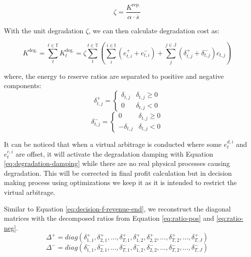 \begin{equation*}
\zeta = \frac{K^{\text{rep.}}}{\alpha \cdot \overline{s}}
\end{equation*}

With the unit degradation $\zeta$, we can then calculate degradation cost as:

\begin{equation}
\label{eq:degradation-damping}
K^{\text{deg.}} = \sum_{t}^{t \in \mathbb{T}} K^{\text{deg.}} _t = \zeta \sum_{t}^{t \in \mathbb{T}} \left(\sum_{i}^{i \in \mathbb{I}}(e_{t,i}^{+}+e_{t,i}^{-})+\sum_{j}^{j \in \mathbb{J}}(\delta_{t,j}^{+}+\delta_{t,j}^{-})c_{t,j}\right)
\end{equation}

where, the energy to reserve ratios are separated to positive and negative components:
\begin{equation}
\label{eq:ratio-pos}
\delta_{t,j}^{+} = \begin{cases}
\delta_{t,j} & \delta_{t,j}  \geq 0\\
0 & \delta_{t,j} < 0
\end{cases}
\end{equation}
\begin{equation}
\label{eq:ratio-neg}
\delta_{t,j}^- = \begin{cases}
0 & \delta_{t,j} \geq 0\\
-\delta_{t,j} & \delta_{t,j}  < 0
\end{cases}
\end{equation}

It can be noticed that when a virtual arbitrage is conducted where some $e_t^{d,i}$ and $e_t^{c,i}$ are offset, it will activate the degradation damping with Equation \eqref{eq:degradation-damping} while there are no real physical processes causing degradation. This will be corrected in final profit calculation but in decision making process using optimizations we keep it as it is intended to restrict the virtual arbitrage.

Similar to Equation \eqref{eq:decision-f-revenue-end}, we reconstruct the diagonal matrices with the decomposed ratios from Equation \eqref{eq:ratio-pos} and \eqref{eq:ratio-neg}.
\begin{equation}
\label{eq:ratio-pos-m}
\Delta^+ = diag (
\delta^+_{1,1}, \delta^+_{2,1},\dots , \delta^+_{T,1},\delta^+_{1,2},\delta^+_{2,2}, \dots,\delta^+_{T,2}, \dots, \delta^+_{T,J})
\end{equation}
\begin{equation}
\label{eq:ratio-neg-m}
\Delta^- = diag (
\delta^-_{1,1}, \delta^-_{2,1},\dots , \delta^-_{T,1},\delta^-_{1,2},\delta^-_{2,2}, \dots,\delta^-_{T,2}, \dots, \delta^-_{T,J})
\end{equation}

